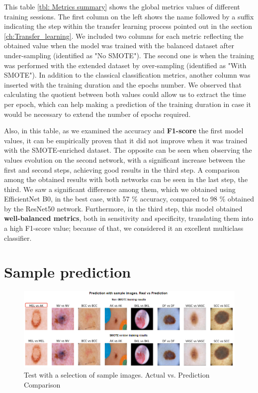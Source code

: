 This table \ref{tbl: Metrics summary} shows the global metrics values of different training sessions. The first column on the left shows the name followed by a suffix indicating the step within the transfer learning process pointed out in the section \ref{ch:Transfer_learning}. We included two columns for each metric reflecting the obtained value when the model was trained with the balanced dataset after under-sampling (identified as "No SMOTE"). The second one is when the training was performed with the extended dataset by over-sampling (identified as "With SMOTE"). In addition to the classical classification metrics, another column was inserted with the training duration and the epochs number. We observed that calculating the quotient between both values could allow us to extract the time per epoch, which can help making a prediction of the training duration in case it would be necessary to extend the number of epochs required. 

Also, in this table, as we examined the accuracy and \textbf{F1-score} the first model values, it can be empirically proven that it did not improve when it was trained with the SMOTE-enriched dataset. The opposite can be seen when observing the values evolution on the second network, with a significant increase between the first and second steps, achieving good results in the third step. A comparison among the obtained results with both networks can be seen in the last step, the third. We saw a significant difference among them, which we obtained using EfficientNet B0, in the best case, with 57 \% accuracy, compared to 98 \% obtained by the ResNet50 network. Furthermore, in the third step, this model obtained \textbf{well-balanced metrics}, both in sensitivity and specificity, translating them into a high F1-score value; because of that, we considered it an excellent multiclass classifier.

\section{Sample prediction}

\begin{figure}[ht]
    \centering
        \includegraphics[scale=0.60]{images/Conclusion/Sample images Real vs Prediction.png}
        \caption{Test with a selection of sample images. Actual vs. Prediction Comparison}
    \label{fig: Sample Images real vs prediction}
\end{figure}

